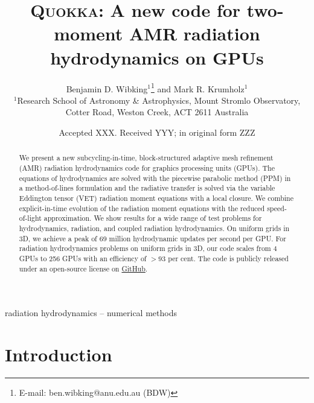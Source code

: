 \documentclass[fleqn,usenatbib]{mnras}
\title[Two-moment AMR radiation hydrodynamics on GPUs]{\textsc{Quokka}: A new code for two-moment AMR radiation hydrodynamics on GPUs}
\author[B. D. Wibking et al.]{
    Benjamin D. Wibking$^{1}$\thanks{E-mail: ben.wibking@anu.edu.au (BDW)}
    and Mark R. Krumholz$^{1}$
\\
$^{1}$Research School of Astronomy \& Astrophysics, Mount Stromlo Observatory, Cotter Road, Weston Creek, ACT 2611 Australia\\
}
\date{Accepted XXX. Received YYY; in original form ZZZ}
\begin{document}
\label{firstpage}
\pagerange{\pageref{firstpage}--\pageref{lastpage}}
\maketitle

\begin{abstract}
    We present a new subcycling-in-time, block-structured adaptive mesh refinement (AMR) radiation hydrodynamics code for graphics processing units (GPUs). The equations of hydrodynamics are solved with the piecewise parabolic method (PPM) in a method-of-lines formulation and the radiative transfer is solved via the variable Eddington tensor (VET) radiation moment equations with a local closure. We combine explicit-in-time evolution of the radiation moment equations with the reduced speed-of-light approximation. We show results for a wide range of test problems for hydrodynamics, radiation, and coupled radiation hydrodynamics. On uniform grids in 3D, we achieve a peak of $69$ million hydrodynamic updates per second per GPU. For radiation hydrodynamics problems on uniform grids in 3D, our code scales from 4 GPUs to 256 GPUs with an efficiency of $>93$ per cent. The code is publicly released under an open-source license on \faGithub\href{https://github.com/BenWibking/quokka-code}{GitHub}.
\end{abstract}

\begin{keywords}
radiation hydrodynamics -- numerical methods
\end{keywords}



\section{Introduction}

\end{document}
